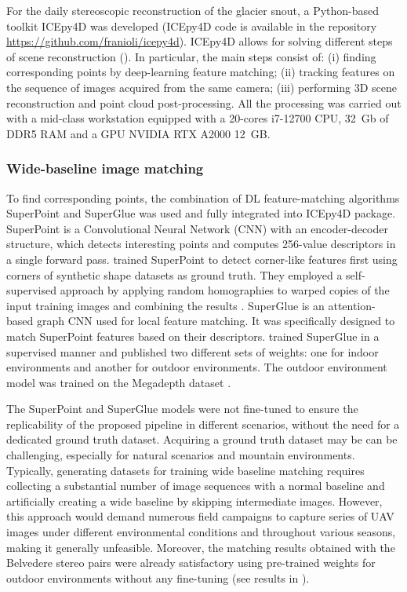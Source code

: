 For the daily stereoscopic reconstruction of the glacier snout, a Python-based toolkit
ICEpy4D was developed (ICEpy4D code is available in the repository
\url{https://github.com/franioli/icepy4d}).
ICEpy4D allows for solving different steps of scene reconstruction
(). In particular, the main steps consist of:
(i) finding corresponding points by deep-learning feature matching;
(ii) tracking features on the sequence of images acquired from the same camera;
(iii) performing 3D scene reconstruction and point cloud post-processing.
All the processing was carried out with a mid-class workstation equipped with a 20-cores
i7-12700 CPU, 32~Gb of DDR5 RAM and a GPU NVIDIA RTX A2000 12~GB.

\subsubsection{Wide-baseline image matching}\label{sec:4:matching}

To find corresponding points, the combination of DL feature-matching algorithms
SuperPoint \citep{DeTone_2018} and SuperGlue \citep{sarlin2020superglue} was used and
fully integrated into ICEpy4D package.
SuperPoint is a Convolutional Neural Network (CNN) with an encoder-decoder
structure, which detects interesting points and computes 256-value descriptors in a
single forward pass.
\cite{DeTone_2018} trained SuperPoint to detect corner-like features first using corners
of synthetic shape datasets as ground truth.
They employed a self-supervised approach by applying random homographies to warped
copies of the input training images and combining the results \citep{DeTone_2018}.
SuperGlue is an attention-based graph CNN used for local feature matching.
It was specifically designed to match SuperPoint features based on their descriptors.
\cite{sarlin2020superglue} trained SuperGlue in a supervised manner and published two
different sets of weights: one for indoor environments and another for outdoor
environments.
The outdoor environment model was trained on the Megadepth dataset
\citep{Li_Snavely_2018_MegaDepth}.

The SuperPoint and SuperGlue models were not fine-tuned to ensure the replicability of
the proposed pipeline in different scenarios, without the need for a
dedicated ground truth dataset.
Acquiring a ground truth dataset may be can be challenging, especially for natural
scenarios and mountain environments.
Typically, generating datasets for training wide baseline matching requires collecting a
substantial number of image sequences with a normal baseline and artificially creating a
wide baseline by skipping intermediate images.
However, this approach would demand numerous field campaigns to capture series of UAV
images under different environmental conditions and throughout various seasons, making it
generally unfeasible.
Moreover, the matching results obtained with the Belvedere stereo pairs were already
satisfactory using pre-trained weights for outdoor environments without any fine-tuning
(see results in ).

